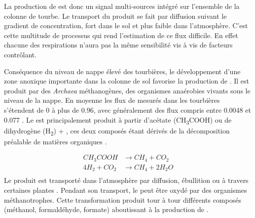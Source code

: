 La production de \coo est donc un signal multi-sources intégré sur l'ensemble de la colonne de tourbe.
Le transport du \coo produit se fait par diffusion suivant le gradient de concentration, fort dans le sol et plus faible dans l'atmosphère.
C'est cette multitude de processus qui rend l'estimation de ce flux difficile.
En effet chacune des respirations n'aura pas la même sensibilité vis à vis de facteurs contrôlant.




Conséquence du niveau de nappe élevé des tourbières, le développement d'une zone anoxique importante dans la colonne de sol favorise la production de \chh.
Il est produit par des \textit{Archaea} méthanogènes, des organismes anaérobies vivants sous le niveau de la nappe.
En moyenne les flux de \chh mesurés dans les tourbières s'étendent de 0 à plus de \SI{0.96}{\uml}, avec généralement des flux compris entre \num{0.0048} et \SI{0.077}{\uml} \citep{blodau2002}.
Le \chh est principalement produit à partir d'acétate (CH\textsubscript{3}COOH) ou de dihydrogène (H\textsubscript{2}) + \coo, ces deux composés étant dérivés de la décomposition préalable de matières organiques \citep{lai2009}.

$$\begin{aligned}
CH_{3}COOH  &\rightarrow CH_{4} + CO_{2}\\
4H_{2} + CO_{2} &\rightarrow CH_{4} + 2H_{2}O\\
\end{aligned} $$
Le \chh produit est transporté dans l'atmosphère par diffusion, ébullition ou à travers certaines plantes \citep{joabsson1999,colmer2003}.
Pendant son transport, le \chh peut être oxydé par des organismes méthanotrophes.
Cette transformation produit tour à tour différents composés (méthanol, formaldéhyde, formate) aboutissant à la production de \coo \citep{whalen2005}.

